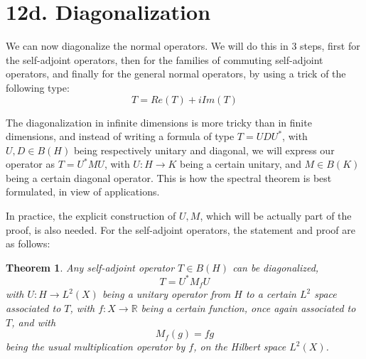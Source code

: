 \documentclass[12pt]{amsbook}
\newtheorem{theorem}{Theorem}[chapter]
\begin{document}
\section*{12d. Diagonalization}

We can now diagonalize the normal operators. We will do this in 3 steps, first for the self-adjoint operators, then for the families of commuting self-adjoint operators, and finally for the general normal operators, by using a trick of the following type:
$$T=Re(T)+iIm(T)$$

The diagonalization in infinite dimensions is more tricky than in finite dimensions, and instead of writing a formula of type $T=UDU^*$, with $U,D\in B(H)$ being respectively unitary and diagonal, we will express our operator as $T=U^*MU$, with $U:H\to K$ being a certain unitary, and $M\in B(K)$ being a certain diagonal operator. This is how the spectral theorem is best formulated, in view of applications. 

\bigskip

In practice, the explicit construction of $U,M$, which will be actually part of the proof, is also needed. For the self-adjoint operators, the statement and proof are as follows:


\begin{theorem}
Any self-adjoint operator $T\in B(H)$ can be diagonalized,
$$T=U^*M_fU$$
with $U:H\to L^2(X)$ being a unitary operator from $H$ to a certain $L^2$ space associated to $T$, with $f:X\to\mathbb R$ being a certain function, once again associated to $T$, and with
$$M_f(g)=fg$$
being the usual multiplication operator by $f$, on the Hilbert space $L^2(X)$.
\end{theorem}
\end{document}
